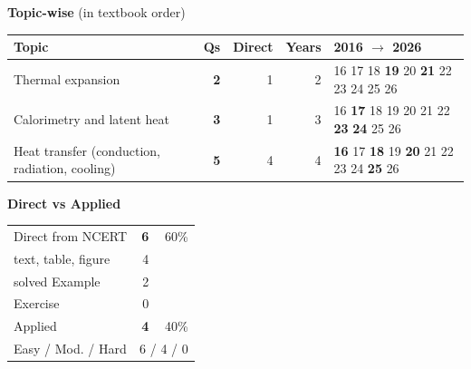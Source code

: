 {\small\textbf{\color{crimson}Topic-wise} (in textbook order)\par\smallskip
\begin{tabularx}{\linewidth}{@{}>{\raggedright\arraybackslash}Xrrrl@{}}\toprule
Topic & Qs & Direct & Years & 2016 $\rightarrow$ 2026\\\midrule
Thermal expansion & \textbf{2} & 1 & 2 & {\scriptsize {\color{gray!45}16} {\color{gray!45}17} {\color{gray!45}18} \textbf{19} {\color{gray!45}20} \textbf{21} {\color{gray!45}22} {\color{gray!45}23} {\color{gray!45}24} {\color{gray!45}25} {\color{gray!45}26}}\\
Calorimetry and latent heat & \textbf{3} & 1 & 3 & {\scriptsize {\color{gray!45}16} \textbf{17} {\color{gray!45}18} {\color{gray!45}19} {\color{gray!45}20} {\color{gray!45}21} {\color{gray!45}22} \textbf{23} \textbf{24} {\color{gray!45}25} {\color{gray!45}26}}\\
Heat transfer (conduction, radiation, cooling) & \textbf{5} & 4 & 4 & {\scriptsize \textbf{16} {\color{gray!45}17} \textbf{18} {\color{gray!45}19} \textbf{20} {\color{gray!45}21} {\color{gray!45}22} {\color{gray!45}23} {\color{gray!45}24} \textbf{25} {\color{gray!45}26}}\\
\bottomrule\end{tabularx}}\par\medskip
\begin{minipage}[t]{0.34\linewidth}{\small\textbf{\color{crimson}Direct vs Applied}\par\smallskip
\begin{tabular}{@{}lrr@{}}\toprule
Direct from NCERT & \textbf{6} & 60\%\\
\quad text, table, figure & 4 &\\
\quad solved Example & 2 &\\
\quad Exercise & 0 &\\
Applied & \textbf{4} & 40\%\\\midrule
Easy / Mod. / Hard & \multicolumn{2}{r}{6 / 4 / 0}\\\bottomrule
\end{tabular}}\end{minipage}\hfill

